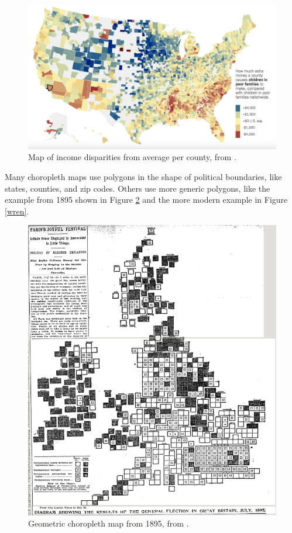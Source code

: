 \documentclass{article}\usepackage[]{graphicx}\usepackage[]{color}
\begin{document}
\begin{figure}[htbp]
\begin{centering}
\includegraphics[width=\textwidth]{img/choropleth}
\caption{Map of income disparities from average per county, from \cite{AisBut2015}.}\label{choropleth}
\end{centering}
\end{figure}

Many choropleth maps use polygons in the shape of political boundaries, like states, counties, and zip codes. Others use more generic polygons, like the example from 1895 shown in Figure \ref{1895} and the more modern example in Figure \ref{wren}.

\begin{figure}[htbp]
\begin{centering}
\includegraphics[height=0.4\textheight]{img/1895}
\caption{Geometric choropleth map from 1895, from \cite{Fel2015}.}\label{1895}
\end{centering}
\end{figure}
\end{document}
